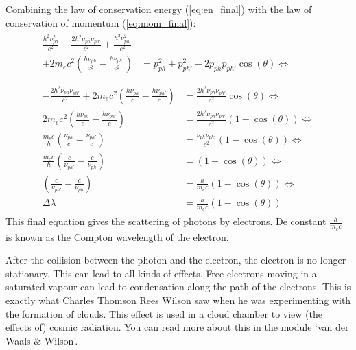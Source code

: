 Combining the law of conservation energy (\ref{eq:en_final}) with the law of conservation of momentum (\ref{eq:mom_final}):
\begin{align}
\begin{aligned} \nonumber
\frac{h^2\nu^2_{ph}}{c^2} - \frac{2h^2\nu_{ph}\nu_{ph'}}{c^2} + \frac{h^2\nu^2_{ph'}}{c^2} & \\
+ 2m_ec^2 \left( \frac{h\nu_{ph}}{c^2} - \frac{h\nu_{ph'}}{c^2} \right) & = p^2_{ph} + p^2_{ph'} - 2p_{ph}p_{ph'}\cos(\theta) \Longleftrightarrow \\
\end{aligned} \\ 
\begin{aligned}
- \frac{2h^2\nu_{ph}\nu_{ph'}}{c^2} + 2m_ec^2 \left( \frac{h\nu_{ph}}{c} - \frac{h\nu_{ph'}}{c} \right) &= \frac{2h^2 \nu_{ph}\nu_{ph'}}{c^2} \cos(\theta) \Longleftrightarrow\\
2m_ec^2 \left( \frac{h\nu_{ph}}{c} - \frac{h\nu_{ph'}}{c} \right) &= \frac{2h^2 \nu_{ph}\nu_{ph'}}{c^2} \left( 1-\cos(\theta) \right) \Longleftrightarrow\\
\frac{m_ec}{h} \left( \frac{\nu_{ph}}{c} - \frac{\nu_{ph'}}{c} \right) &= \frac{\nu_{ph}\nu_{ph'}}{c^2} \left( 1-\cos(\theta) \right) \Longleftrightarrow\\
\frac{m_ec}{h} \left( \frac{c}{\nu_{ph'}} - \frac{c}{\nu_{ph}} \right) &= \left(  1-\cos(\theta) \right) \Longleftrightarrow\\
\left( \frac{c}{\nu_{ph'}} - \frac{c}{\nu_{ph}} \right) &= \frac{h}{m_ec} \left(  1-\cos(\theta) \right) \Longleftrightarrow\\
\Delta \lambda &= \frac{h}{m_ec} \left( 1-\cos(\theta) \right)
\end{aligned}
\end{align}
This final equation gives the scattering of photons by electrons. De constant $\frac{h}{m_ec}$ is known as the Compton wavelength of the electron.

After the collision between the photon and the electron, the electron is no longer stationary. This can lead to all kinds of effects. Free electrons moving in a saturated vapour can lead to condensation along the path of the electrons. This is exactly what Charles Thomson Rees Wilson saw when he was experimenting with the formation of clouds. This effect is used in a cloud chamber to view (the effects of) cosmic radiation. You can read more about this in the module `van der Waals \& Wilson'.


